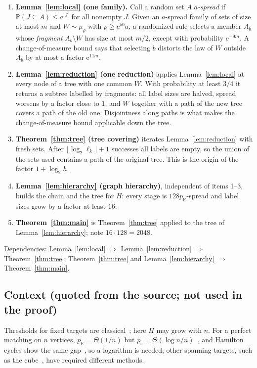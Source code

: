 \documentclass[11pt]{article}
\numberwithin{equation}{section}
\newcommand{\PP}{\mathbb P}
\newcommand{\pc}{p_{\mathrm c}}
\newcommand{\pE}{p_{\mathrm E}}
\newcommand{\ee}{\mathrm e}
\begin{document}
\begin{enumerate}[label=\arabic*.,itemsep=2pt,topsep=3pt]
 \item \textbf{Lemma~\ref{lem:local} (one family).} Call a random set $A$
 \emph{$a$-spread} if $\PP(J\subseteq A)\le a^{|J|}$ for all nonempty $J$.
 Given an $a$-spread family of sets of size at most $m$ and
 $W\sim\mu_\rho$ with $\rho\ge\ee^{50}a$, a randomized rule selects a
 member $A_b$ whose \emph{fragment} $A_b\setminus W$ has size at most
 $m/2$, except with probability $\ee^{-9m}$. A change-of-measure bound
 says that selecting $b$ distorts the law of $W$ outside $A_b$ by at most
 a factor $\ee^{11m}$.
 \item \textbf{Lemma~\ref{lem:reduction} (one reduction)} applies
 Lemma~\ref{lem:local} at every node of a tree with one common $W$. With
 probability at least $3/4$ it returns a subtree labelled by fragments:
 all label sizes are halved, spread worsens by a factor close to $1$, and
 $W$ together with a path of the new tree covers a path of the old one.
 Disjointness along paths is what makes the change-of-measure bound
 applicable down the tree.
 \item \textbf{Theorem~\ref{thm:tree} (tree covering)} iterates
 Lemma~\ref{lem:reduction} with fresh sets. After
 $\lfloor\log_2\ell_k\rfloor+1$ successes all labels are empty, so the
 union of the sets used contains a path of the original tree. This is the
 origin of the factor $1+\log_2h$.
 \item \textbf{Lemma~\ref{lem:hierarchy} (graph hierarchy)}, independent
 of items 1--3, builds the chain and the tree for $H$: every stage is
 $128\pE$-spread and label sizes grow by a factor at least $16$.
 \item \textbf{Theorem~\ref{thm:main}} is Theorem~\ref{thm:tree} applied
 to the tree of Lemma~\ref{lem:hierarchy}; note $16\cdot128=2048$.
\end{enumerate}
Dependencies: Lemma~\ref{lem:local} $\Rightarrow$
Lemma~\ref{lem:reduction} $\Rightarrow$ Theorem~\ref{thm:tree};
Theorem~\ref{thm:tree} and Lemma~\ref{lem:hierarchy} $\Rightarrow$
Theorem~\ref{thm:main}.

\subsection*{Context (quoted from the source; not used in the proof)}

Thresholds for fixed targets are classical~\cite{ER60,Bollobas81}; here
$H$ may grow with $n$. For a perfect matching on $n$ vertices,
$\pE=\Theta(1/n)$ but $\pc=\Theta(\log n/n)$~\cite{ER66,KK07}, and
Hamilton cycles show the same gap~\cite{KK07}, so a logarithm is needed;
other spanning targets, such as the cube~\cite{Riordan00}, have required
different methods.
\end{document}
